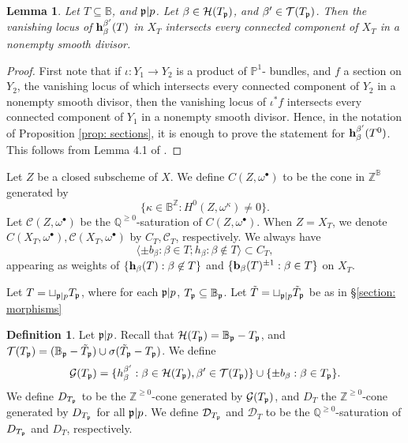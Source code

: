 \documentclass[11pt,pdflatex]{amsart}
\theoremstyle{plain}
\newtheorem{lemma}[theorem]{Lemma}
\theoremstyle{definition}
\newcommand{\QQ}{\mathbf{Q}}
\newcommand{\ZZ}{\mathbf{Z}}
\theoremstyle{plain}
\theoremstyle{definition}
\newtheorem{dfn}[theorem]{Definition}
\theoremstyle{remark}
\numberwithin{equation}{section}
\numberwithin{figure}{section} \numberwithin{table}{subsection}
\newcommand{\gerp}{{\frak{p}}}
\newcommand{\calC}{{\mathcal{C}}}
\newcommand{\calD}{{\mathcal{D}}}
\newcommand{\calG}{{\mathcal{G}}}
\newcommand{\calH}{{\mathcal{H}}}
\newcommand{\calT}{{\mathcal{T}}}
\def\BB{\mathbb{B}}
\def\PP{\mathbb{P}}
\def\QQ{\mathbb{Q}}
\def\ZZ{\mathbb{Z}}
\begin{document}
\begin{lemma}\label{lemma: intersect} Let $T\subseteq \BB$, and $\gerp |p$. Let $\beta\in \calH(T_\gerp)$, and $\beta' \in \calT(T_\gerp)$. Then the vanishing locus of ${\bf h}_\beta^{\beta'}(T)$ in $X_T$ intersects every connected component of $X_T$ in a nonempty smooth divisor.
\end{lemma}

\begin{proof} First note that if $\iota: Y_1 \rightarrow Y_2$ is a product of $\PP^1$- bundles, and $f$ a section on $Y_2$, the vanishing locus of which intersects every connected component of $Y_2$ in a nonempty smooth divisor, then the vanishing locus of $\iota^*f$ intersects every connected component of $Y_1$ in  a nonempty smooth divisor. Hence, in the notation of Proposition \ref{prop: sections}, it is enough to prove the statement for ${\bf h}_\beta^{\beta'}(T^0)$. This follows from  Lemma 4.1 of \cite{DK1}.  
\end{proof}

Let $ Z$ be a closed subscheme of $X$. We define $C(Z,\omega^\bullet)$ to be the cone in $\ZZ^\BB$ generated by $$\{\kappa \in \BB^\ZZ:  H^0(Z,\omega^\kappa) \neq 0\}.$$
Let $\calC(Z,\omega^\bullet)$ be the $\QQ^{\geq 0}$-saturation of $C(Z,\omega^\bullet)$.
When $Z=X_T$, we denote $C(X_T,\omega^\bullet), \calC(X_T,\omega^\bullet)$ by $C_T, \calC_T$, respectively. We always have
$$\langle \pm b_\beta: \beta \in T; h_\beta: \beta \not\in T \rangle \subset C_T,$$
appearing as weights of $\{{\bf h}_\beta(T): \beta \not\in T\}$ and $\{ {\bf b}_\beta(T)^{\pm 1}: \beta \in T\}$ on $X_T$.
 
 Let $T = \sqcup_{\gerp|p} T_\gerp$, where for each $\gerp|p$, $T_\gerp \subseteq \BB_\gerp$. Let $\tilde{T}=\sqcup_{\gerp|p} \tilde{T}_\gerp$ be as in \S \ref{section: morphisms} 
\begin{dfn}\label{dfn: D cones} Let $\gerp|p$. 
Recall that $\calH(T_\gerp)=\BB_\gerp-T_\gerp$, and $\calT(T_\gerp)=(\BB_\gerp-\tilde{T}_\gerp) \cup \sigma(\tilde{T}_\gerp-T_\gerp)$. We define
$$\calG(T_\gerp)=\{h_\beta^{\beta'}:  \beta \in \calH(T_\gerp), \beta' \in \calT(T_\gerp)\} \cup \{\pm b_\beta: \beta \in T_\gerp \}.$$
We define $D_{T_\gerp}$ to be the $\ZZ^{\geq 0}$-cone generated by $\calG(T_\gerp)$, and $D_T$ the $\ZZ^{\geq 0}$-cone generated by $D_{T_\gerp}$ for all $\gerp|p$. We define $\calD_{T_\gerp}$ and $\calD_T$ to be the  $\QQ^{\geq 0}$-saturation of $D_{T_\gerp}$ and $D_T$, respectively.
\end{dfn}
\end{document}
